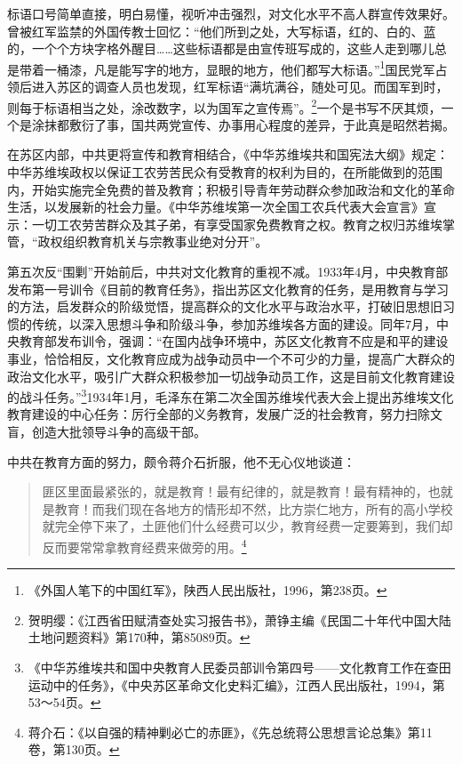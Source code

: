 标语口号简单直接，明白易懂，视听冲击强烈，对文化水平不高人群宣传效果好。曾被红军监禁的外国传教士回忆：“他们所到之处，大写标语，红的、白的、蓝的，一个个方块字格外醒目……这些标语都是由宣传班写成的，这些人走到哪儿总是带着一桶漆，凡是能写字的地方，显眼的地方，他们都写大标语。”\footnote{《外国人笔下的中国红军》，陕西人民出版社，1996，第238页。}国民党军占领后进入苏区的调查人员也发现，红军标语“满坑满谷，随处可见。而国军到时，则每于标语相当之处，涂改数字，以为国军之宣传焉”。\footnote{贺明缨：《江西省田赋清查处实习报告书》，萧铮主编《民国二十年代中国大陆土地问题资料》第170种，第85089页。}一个是书写不厌其烦，一个是涂抹都敷衍了事，国共两党宣传、办事用心程度的差异，于此真是昭然若揭。


在苏区内部，中共更将宣传和教育相结合，《中华苏维埃共和国宪法大纲》规定：中华苏维埃政权以保证工农劳苦民众有受教育的权利为目的，在所能做到的范围内，开始实施完全免费的普及教育；积极引导青年劳动群众参加政治和文化的革命生活，以发展新的社会力量。《中华苏维埃第一次全国工农兵代表大会宣言》宣示：一切工农劳苦群众及其子弟，有享受国家免费教育之权。教育之权归苏维埃掌管，“政权组织教育机关与宗教事业绝对分开”。


第五次反“围剿”开始前后，中共对文化教育的重视不减。1933年4月，中央教育部发布第一号训令《目前的教育任务》，指出苏区文化教育的任务，是用教育与学习的方法，启发群众的阶级觉悟，提高群众的文化水平与政治水平，打破旧思想旧习惯的传统，以深入思想斗争和阶级斗争，参加苏维埃各方面的建设。同年7月，中央教育部发布训令，强调：“在国内战争环境中，苏区文化教育不应是和平的建设事业，恰恰相反，文化教育应成为战争动员中一个不可少的力量，提高广大群众的政治文化水平，吸引广大群众积极参加一切战争动员工作，这是目前文化教育建设的战斗任务。”\footnote{《中华苏维埃共和国中央教育人民委员部训令第四号——文化教育工作在查田运动中的任务》，《中央苏区革命文化史料汇编》，江西人民出版社，1994，第53～54页。}1934年1月，毛泽东在第二次全国苏维埃代表大会上提出苏维埃文化教育建设的中心任务：厉行全部的义务教育，发展广泛的社会教育，努力扫除文盲，创造大批领导斗争的高级干部。


中共在教育方面的努力，颇令蒋介石折服，他不无心仪地谈道：

\begin{quote}

匪区里面最紧张的，就是教育！最有纪律的，就是教育！最有精神的，也就是教育！而我们现在各地方的情形却不然，比方崇仁地方，所有的高小学校就完全停下来了，土匪他们什么经费可以少，教育经费一定要筹到，我们却反而要常常拿教育经费来做旁的用。\footnote{蒋介石：《以自强的精神剿必亡的赤匪》，《先总统蒋公思想言论总集》第11卷，第130页。}
\end{quote}


